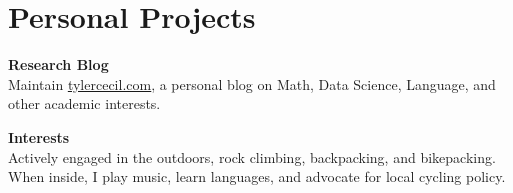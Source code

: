 \documentclass{tc_cv}
\begin{document}
\begin{minipage}[t]{0.3\linewidth}
  \vspace{2em}
  \section{Personal Projects}
  \textbf{Research Blog}\\
  Maintain \href{https://tylercecil.com}{\ul{tylercecil.com}}, a personal blog
  on Math, Data Science, Language, and other academic interests.
  \vspace{0.25em}

  \textbf{Interests}\\
  Actively engaged in the outdoors, rock climbing, backpacking, and
  bikepacking. When inside, I play music, learn languages, and advocate for
  local cycling policy.

\end{minipage}
\hfill\vline\hfill
\end{document}
